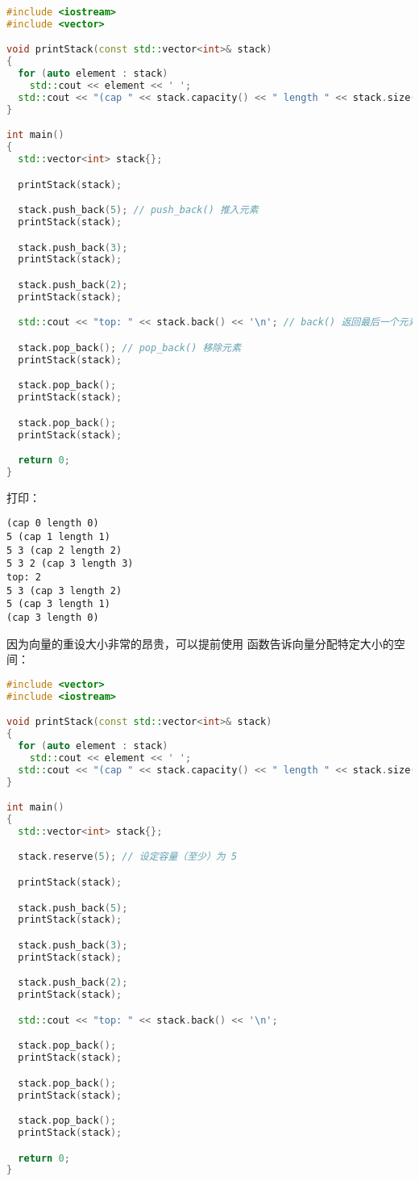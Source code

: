 \documentclass[../../LearnCpp.tex]{subfiles}
\begin{document}
\begin{lstlisting}[language=C++]
#include <iostream>
#include <vector>

void printStack(const std::vector<int>& stack)
{
  for (auto element : stack)
    std::cout << element << ' ';
  std::cout << "(cap " << stack.capacity() << " length " << stack.size() << ")\n";
}

int main()
{
  std::vector<int> stack{};

  printStack(stack);

  stack.push_back(5); // push_back() 推入元素
  printStack(stack);

  stack.push_back(3);
  printStack(stack);

  stack.push_back(2);
  printStack(stack);

  std::cout << "top: " << stack.back() << '\n'; // back() 返回最后一个元素

  stack.pop_back(); // pop_back() 移除元素
  printStack(stack);

  stack.pop_back();
  printStack(stack);

  stack.pop_back();
  printStack(stack);

  return 0;
}
\end{lstlisting}

打印：

\begin{lstlisting}
(cap 0 length 0)
5 (cap 1 length 1)
5 3 (cap 2 length 2)
5 3 2 (cap 3 length 3)
top: 2
5 3 (cap 3 length 2)
5 (cap 3 length 1)
(cap 3 length 0)
\end{lstlisting}

因为向量的重设大小非常的昂贵，可以提前使用  函数告诉向量分配特定大小的空间：

\begin{lstlisting}[language=C++]
#include <vector>
#include <iostream>

void printStack(const std::vector<int>& stack)
{
  for (auto element : stack)
    std::cout << element << ' ';
  std::cout << "(cap " << stack.capacity() << " length " << stack.size() << ")\n";
}

int main()
{
  std::vector<int> stack{};

  stack.reserve(5); // 设定容量（至少）为 5

  printStack(stack);

  stack.push_back(5);
  printStack(stack);

  stack.push_back(3);
  printStack(stack);

  stack.push_back(2);
  printStack(stack);

  std::cout << "top: " << stack.back() << '\n';

  stack.pop_back();
  printStack(stack);

  stack.pop_back();
  printStack(stack);

  stack.pop_back();
  printStack(stack);

  return 0;
}
\end{lstlisting}
\end{document}
